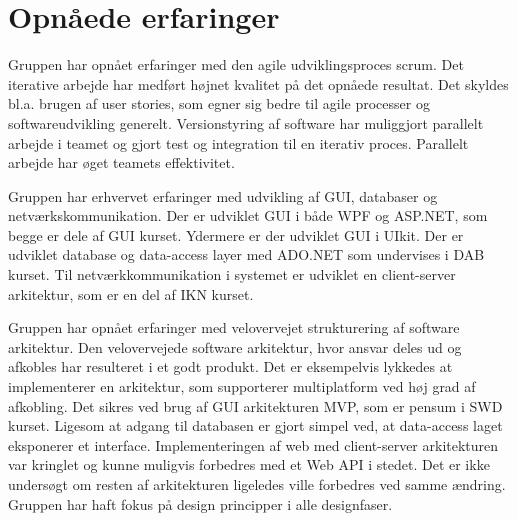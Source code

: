 \chapter{Opnåede erfaringer}



Gruppen har opnået erfaringer med den agile udviklingsproces scrum. Det iterative arbejde har medført højnet kvalitet på det opnåede resultat. Det skyldes bl.a. brugen af user stories, som egner sig bedre til agile processer og softwareudvikling generelt. Versionstyring af software har muliggjort parallelt arbejde i teamet og gjort test og integration til en iterativ proces. Parallelt arbejde har øget teamets effektivitet.

Gruppen har erhvervet erfaringer med udvikling af GUI, databaser og netværkskommunikation. Der er udviklet GUI i både WPF og ASP.NET, som begge er dele af GUI kurset. Ydermere er der udviklet GUI i UIkit. Der er udviklet database og data-access layer med ADO.NET som undervises i DAB kurset. Til netværkkommunikation i systemet er udviklet en client-server arkitektur, som er en del af IKN kurset.

Gruppen har opnået erfaringer med velovervejet strukturering af software arkitektur. Den velovervejede software arkitektur, hvor ansvar deles ud og afkobles har resulteret i et godt produkt. Det er eksempelvis lykkedes at implementerer en arkitektur, som supporterer multiplatform ved høj grad af afkobling. Det sikres ved brug af GUI arkitekturen MVP, som er pensum i SWD kurset. 
Ligesom at adgang til databasen er gjort simpel ved, at data-access laget eksponerer et interface. 
Implementeringen af web med client-server arkitekturen var kringlet og kunne muligvis forbedres med et Web API i stedet. Det er ikke undersøgt om resten af arkitekturen ligeledes ville forbedres ved samme ændring. Gruppen har haft fokus på design principper i alle designfaser. 

